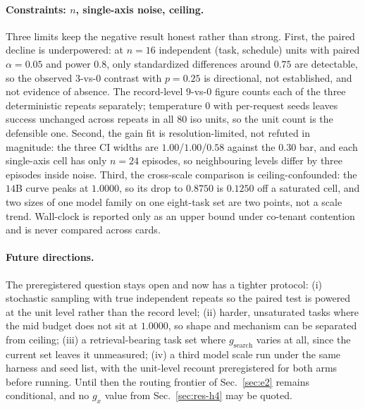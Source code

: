 \documentclass[10pt]{article} %
\begin{document}
\paragraph{Constraints: $n$, single-axis noise, ceiling.} Three limits keep the negative result honest
rather than strong. First, the paired decline is underpowered: at $n{=}16$ independent
(task, schedule) units with paired $\alpha{=}0.05$ and power $0.8$, only standardized differences
around $0.75$ are detectable, so the observed $3$-vs-$0$ contrast with $p{=}0.25$ is directional,
not established, and not evidence of absence. The record-level $9$-vs-$0$ figure counts each of the
three deterministic repeats separately; temperature $0$ with per-request seeds leaves success unchanged
across repeats in all $80$ iso units, so the unit count is the defensible one. Second, the gain fit is
resolution-limited, not refuted in magnitude: the three CI widths are $1.00$/$1.00$/$0.58$ against the
$0.30$ bar, and each single-axis cell has only $n{=}24$ episodes, so neighbouring levels differ by
three episodes inside noise. Third, the cross-scale comparison is ceiling-confounded: the $14$B curve
peaks at $1.0000$, so its drop to $0.8750$ is $0.1250$ off a saturated cell, and two sizes of one model
family on one eight-task set are two points, not a scale trend. Wall-clock is reported only as an upper
bound under co-tenant contention and is never compared across cards.

\paragraph{Future directions.} The preregistered question stays open and now has a tighter protocol:
(i) stochastic sampling with true independent repeats so the paired test is powered at the unit level
rather than the record level; (ii) harder, unsaturated tasks where the mid budget does not sit at
$1.0000$, so shape and mechanism can be separated from ceiling; (iii) a retrieval-bearing task set
where $g_{\mathrm{search}}$ varies at all, since the current set leaves it unmeasured; (iv) a third
model scale run under the same harness and seed list, with the unit-level recount preregistered for
both arms before running. Until then the routing frontier of Sec.~\ref{sec:e2} remains conditional,
and no $g_x$ value from Sec.~\ref{sec:res-h4} may be quoted.
\end{document}
